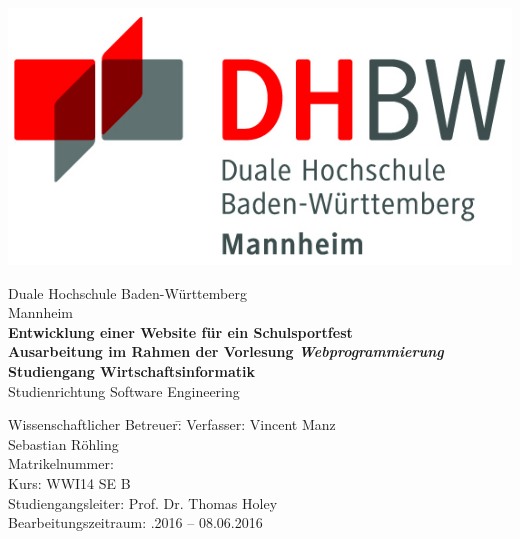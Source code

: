 \begin{titlepage}
	\begin{minipage}{\textwidth}
		\vspace{-2cm}
		\noindent \hfill   \includegraphics{img/logo.jpg}
	\end{minipage}
	\vspace{1em}
	\sffamily
	\begin{center}
		\textsf{\large{}Duale Hochschule Baden-W\"urttemberg\\[1.5mm] Mannheim}\\[2em]
		\textsf{\textbf{\Large{}Entwicklung einer Website für ein Schulsportfest}}\\[3mm]
		\textsf{\textbf{Ausarbeitung im Rahmen der Vorlesung \textit{Webprogrammierung}}} \\[1.5cm]
		\textsf{\textbf{\Large{}Studiengang Wirtschaftsinformatik}\\[3mm] \textsf{Studienrichtung Software Engineering}}
		
		\vspace{3em}
		\vfill
		
		\begin{minipage}{\textwidth}
			
			\begin{tabbing}
				Wissenschaftlicher Betreuer:\hspace{0.85cm}\=\kill
				Verfasser: \>Vincent Manz \\[1mm]
				\>Sebastian Röhling \\[1mm]
				Matrikelnummer:  \\[1mm]
				Kurs: \> WWI14 SE B \\[1mm]
				Studiengangsleiter: \> Prof. Dr. Thomas Holey  \\[1mm]
				Bearbeitungszeitraum: .2016 -- 08.06.2016
			\end{tabbing}
		\end{minipage}
		
	\end{center}
	
\end{titlepage}